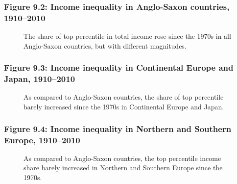 \documentclass[t]{beamer}\usepackage[]{graphicx}\usepackage[]{color}
\begin{document}
\begin{frame}[label=Figure_9_2]
\frametitle{Figure 9.2: Income inequality in Anglo-Saxon countries, 1910--2010}
\begin{figure}[t]
\begin{minipage}[b]{\textwidth}
\centering

\caption{The share of top percentile in total income rose since the 1970s in all Anglo-Saxon countries, but with different magnitudes.}
\end{minipage}
\end{figure}
\end{frame}


\begin{frame}[label=Figure_9_3]
\frametitle{Figure 9.3: Income inequality in Continental Europe and Japan, 1910--2010}
\begin{figure}[t]
\begin{minipage}[b]{\textwidth}
\centering

\caption{As compared to Anglo-Saxon countries, the share of top percentile barely increased since the 1970s in Continental Europe and Japan.}
\end{minipage}
\end{figure}
\end{frame}


\begin{frame}[label=Figure_9_4]
\frametitle{Figure 9.4: Income inequality in Northern and Southern Europe, 1910--2010}
\begin{figure}[t]
\begin{minipage}[b]{\textwidth}
\centering

\caption{As compared to Anglo-Saxon countries, the top percentile income share barely increased in Northern and Southern Europe since the 1970s.}
\end{minipage}
\end{figure}
\end{frame}
\end{document}
